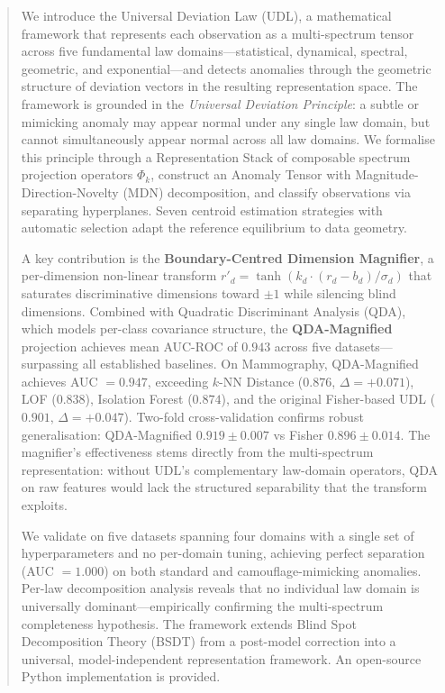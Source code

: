 \documentclass[journal]{IEEEtran}
\begin{document}
\begin{abstract}
We introduce the Universal Deviation Law (UDL), a mathematical framework that represents each observation as a multi-spectrum tensor across five fundamental law domains---statistical, dynamical, spectral, geometric, and exponential---and detects anomalies through the geometric structure of deviation vectors in the resulting representation space. The framework is grounded in the \textit{Universal Deviation Principle}: a subtle or mimicking anomaly may appear normal under any single law domain, but cannot simultaneously appear normal across all law domains. We formalise this principle through a Representation Stack of composable spectrum projection operators $\Phi_k$, construct an Anomaly Tensor with Magnitude-Direction-Novelty (MDN) decomposition, and classify observations via separating hyperplanes. Seven centroid estimation strategies with automatic selection adapt the reference equilibrium to data geometry.

A key contribution is the \textbf{Boundary-Centred Dimension Magnifier}, a per-dimension non-linear transform $r'_d = \tanh(k_d \cdot (r_d - b_d) / \sigma_d)$ that saturates discriminative dimensions toward $\pm 1$ while silencing blind dimensions. Combined with Quadratic Discriminant Analysis (QDA), which models per-class covariance structure, the \textbf{QDA-Magnified} projection achieves mean AUC-ROC of $0.943$ across five datasets---surpassing all established baselines. On Mammography, QDA-Magnified achieves AUC $= 0.947$, exceeding $k$-NN Distance ($0.876$, $\Delta{=}+0.071$), LOF ($0.838$), Isolation Forest ($0.874$), and the original Fisher-based UDL ($0.901$, $\Delta{=}+0.047$). Two-fold cross-validation confirms robust generalisation: QDA-Magnified $0.919 \pm 0.007$ vs Fisher $0.896 \pm 0.014$. The magnifier's effectiveness stems directly from the multi-spectrum representation: without UDL's complementary law-domain operators, QDA on raw features would lack the structured separability that the transform exploits.

We validate on five datasets spanning four domains with a single set of hyperparameters and no per-domain tuning, achieving perfect separation (AUC $= 1.000$) on both standard and camouflage-mimicking anomalies. Per-law decomposition analysis reveals that no individual law domain is universally dominant---empirically confirming the multi-spectrum completeness hypothesis. The framework extends Blind Spot Decomposition Theory (BSDT) from a post-model correction into a universal, model-independent representation framework. An open-source Python implementation is provided.
\end{abstract}
\end{document}

